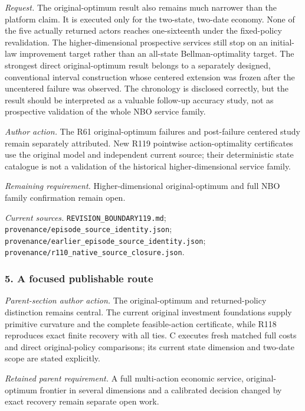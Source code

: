 \par\emph{Request.} The original-optimum result also remains much narrower than the platform claim. It is executed only for the two-state, two-date economy. None of the five actually returned actors reaches one-sixteenth under the fixed-policy revalidation. The higher-dimensional prospective services still stop on an initial-law improvement target rather than an all-state Bellman-optimality target. The strongest direct original-optimum result belongs to a separately designed, conventional interval construction whose centered extension was frozen after the uncentered failure was observed. The chronology is disclosed correctly, but the result should be interpreted as a valuable follow-up accuracy study, not as prospective validation of the whole NBO service family.

\par\emph{Author action.} The R61 original-optimum failures and post-failure centered study remain separately attributed. New R119 pointwise action-optimality certificates use the original model and independent current source; their deterministic state catalogue is not a validation of the historical higher-dimensional service family.

\par\emph{Remaining requirement.} Higher-dimensional original-optimum and full NBO family confirmation remain open.

\par\emph{Current sources.} \nolinkurl{REVISION_BOUNDARY119.md}; \nolinkurl{provenance/episode_source_identity.json}; \nolinkurl{provenance/earlier_episode_source_identity.json}; \nolinkurl{provenance/r110_native_source_closure.json}.

\subsubsection{5. A focused publishable route}

\emph{Parent-section author action.} The original-optimum and returned-policy distinction remains central. The current original investment foundations supply primitive curvature and the complete feasible-action certificate, while R118 reproduces exact finite recovery with all ties. C executes fresh matched full costs and direct original-policy comparisons; its current state dimension and two-date scope are stated explicitly.

\par\emph{Retained parent requirement.} A full multi-action economic service, original-optimum frontier in several dimensions and a calibrated decision changed by exact recovery remain separate open work.

